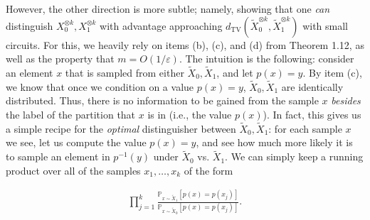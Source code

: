 \documentclass[10pt,a4paper]{article}
\begin{document}
However, the other direction is more subtle; namely, showing that one \emph{can} distinguish $X_{0}^{\otimes k},X_{1}^{\otimes k}$ with advantage approaching $d_{\mathrm{TV}}(\widetilde{X}_{0}^{\otimes k},\widetilde{X}_{1}^{\otimes k})$ with small circuits. For this, we heavily rely on items (b), (c), and (d) from Theorem 1.12, as well as the property that $m=O(1/\varepsilon)$. The intuition is the following: consider an element $x$ that is sampled from either $\widetilde{X}_{0},\widetilde{X}_{1}$, and let $p(x)=y$. By item (c), we know that once we condition on a value $p(x)=y$, $\widetilde{X}_{0},\widetilde{X}_{1}$ are identically distributed. Thus, there is no information to be gained from the sample $x$ \emph{besides} the label of the partition that $x$ is in (i.e., the value $p(x)$). In fact, this gives us a simple recipe for the \emph{optimal} distinguisher between $\widetilde{X}_{0},\widetilde{X}_{1}$: for each sample $x$ we see, let us compute the value $p(x)=y$, and see how much more likely it is to sample an element in $p^{-1}(y)$ under $\widetilde{X}_{0}$ vs. $\widetilde{X}_{1}$. We can simply keep a running product over all of the samples $x_{1},\dots,x_{k}$ of the form\par


\[\begin{gathered}
\prod_{j=1}^{k}\frac{\mathbb{P}_{x\sim\widetilde{X}_{1}}[p(x)=p(x_{j})]}{\mathbb{P}_{x\sim\widetilde{X}_{0}}[p(x)=p(x_{j})]}.
\end{gathered}\]
\end{document}
